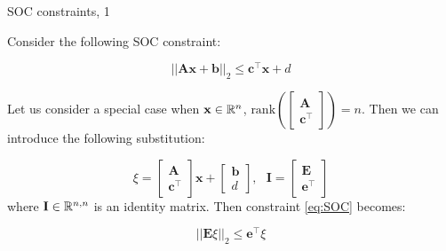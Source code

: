 \documentclass{beamer}
\begin{document}
\begin{frame}{SOC constraints, 1}
	\begin{flushleft}
		
		Consider the following SOC constraint:
		
		\begin{equation}
			\label{eq:SOC}
			||\mathbf{A}\mathbf{x} + \mathbf{b}||_2 \leq 
			\mathbf{c}^\top \mathbf{x} + d
		\end{equation}
		
		Let us consider a special case when $\mathbf{x} \in \mathbb{R}^n$, $\text{rank}\left(\begin{bmatrix}
			\mathbf{A} \\ \mathbf{c}^\top
		\end{bmatrix}\right) = n$. Then we can introduce the following substitution:
		
		\begin{equation}
			\xi = \begin{bmatrix}
				\mathbf{A} \\ \mathbf{c}^\top
			\end{bmatrix}
			\mathbf{x} + 
			\begin{bmatrix}
				\mathbf{b} \\ d
			\end{bmatrix}, 
		\ \ \ 
		\mathbf{I} = 
		\begin{bmatrix}
			\mathbf{E} \\ \mathbf{e}^\top
		\end{bmatrix}
		\end{equation}
%
where $\mathbf{I} \in\mathbb{R}^{n, n}$ is an identity matrix. Then constraint \eqref{eq:SOC} becomes:

		\begin{equation}
	||\mathbf{E}\xi||_2 \leq 
	\mathbf{e}^\top \xi
		\end{equation}
		
	\end{flushleft}
\end{frame}
\end{document}
